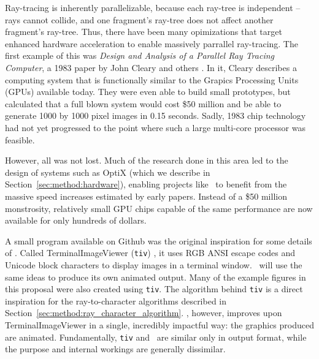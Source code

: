 
Ray-tracing is inherently parallelizable, because each ray-tree is independent -- rays cannot collide, and one fragment's ray-tree does not affect another fragment's ray-tree.
Thus, there have been many opimizations that target enhanced hardware acceleration to enable massively parrallel ray-tracing.
The first example of this was {\it Design and Analysis of a Parallel Ray Tracing Computer}, a 1983 paper by John Cleary and others \cite{cleary1983design}.
In it, Cleary describes a computing system that is functionally similar to the Grapics Processing Units (GPUs) available today.
They were even able to build small prototypes, but calculated that a full blown system would cost \$50 million and be able to generate 1000 by 1000 pixel images in 0.15 seconds.
Sadly, 1983 chip technology had not yet progressed to the point where such a large multi-core processor was feasible.

However, all was not lost.
Much of the research done in this area led to the design of systems such as OptiX \cite{parker2010optix} (which we describe in Section~\ref{sec:method:hardware}), enabling projects like \name\ to benefit from the massive speed increases estimated by early papers.
Instead of a \$50 million monstrosity, relatively small GPU chips capable of the same performance are now available for only hundreds of dollars.


A small program available on Github was the original inspiration for some details of \name.
Called TerminalImageViewer (\texttt{tiv}) \cite{tivGithub}, it uses RGB ANSI escape codes and Unicode block characters to display images in a terminal window.
\name\ will use the same ideas to produce its own animated output.
Many of the example figures in this proposal were also created using \texttt{tiv}.
The algorithm behind \texttt{tiv} is a direct inspiration for the ray-to-character algorithms described in Section~\ref{sec:method:ray_character_algorithm}.
\name, however, improves upon TerminalImageViewer in a single, incredibly impactful way: the graphics produced are animated.
Fundamentally, \texttt{tiv} and \name\ are similar only in output format, while the purpose and internal workings are generally dissimilar.


